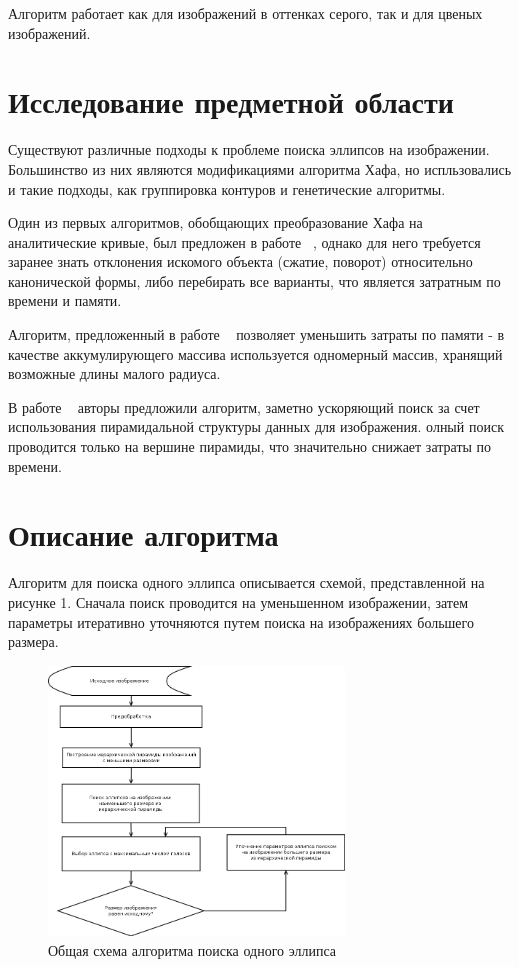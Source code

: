 Алгоритм работает как для изображений в оттенках серого, так и для цвеных изображений.

\section{Исследование предметной области}
Существуют различные подходы к проблеме поиска эллипсов на изображении.  Большинство из них являются модификациями алгоритма Хафа, но испльзовались и такие подходы, как группировка контуров и генетические алгоритмы.

Один из первых алгоритмов, обобщающих преобразование Хафа на аналитические кривые, был предложен в работе ~\autocite{Ballard}, однако для него требуется заранее знать отклонения искомого объекта (сжатие, поворот) относительно канонической формы, либо перебирать все варианты, что является затратным по времени и памяти.

Алгоритм, предложенный в работе ~\autocite{OneDim} позволяет уменьшить затраты по памяти - в качестве аккумулирующего массива используется одномерный массив, хранящий возможные длины малого радиуса.

В работе ~\autocite{Chien} авторы предложили алгоритм, заметно ускоряющий поиск за счет использования пирамидальной структуры данных для изображения. 
олный поиск проводится только на вершине пирамиды, что значительно снижает затраты по времени.

\section{Описание алгоритма}
Алгоритм для поиска одного эллипса описывается схемой, представленной на рисунке 1. 
Сначала поиск проводится на уменьшенном изображении, затем параметры итеративно уточняются путем поиска на изображениях большего размера.
\begin{figure}
\centering
\includegraphics[width=0.7\textwidth]{img/oneellipse.png}
\caption{\label{fig:oneellipse} Общая схема алгоритма поиска одного эллипса}
\end{figure}
